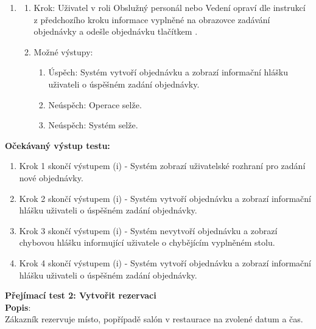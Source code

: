 \documentclass[a4paper,10pt]{article}
\begin{document}
\begin{enumerate}
	\item 
	\begin{enumerate}
		\item Krok: Uživatel v roli Obslužný personál nebo Vedení opraví dle instrukcí z předchozího kroku informace vyplněné na obrazovce zadávání objednávky a odešle objednávku tlačítkem .
		\item Možné výstupy:
		\begin{enumerate}
			\item Úspěch: Systém vytvoří objednávku a zobrazí informační hlášku uživateli o úspěšném zadání objednávky.
			\item Neúspěch: Operace selže.
			\item Neúspěch: Systém selže.
		\end{enumerate} 
	\end{enumerate}
\end{enumerate}

\textbf{Očekávaný výstup testu:} \\
\begin{enumerate}
	\item Krok 1 skončí výstupem (i) - Systém zobrazí uživatelské rozhraní pro zadání nové objednávky.
	\item Krok 2 skončí výstupem (i) - Systém vytvoří objednávku a zobrazí informační hlášku uživateli o úspěšném zadání objednávky.
	\item Krok 3 skončí výstupem (i) - Systém nevytvoří objednávku a zobrazí chybovou hlášku informující uživatele o chybějícím vyplněném stolu.
	\item Krok 4 skončí výstupem (i) - Systém vytvoří objednávku a zobrazí informační hlášku uživateli o úspěšném zadání objednávky.
\end{enumerate}


{\large\textbf{Přejímací test 2: Vytvořit rezervaci}} \\

\textbf{Popis}: \\\indent Zákazník rezervuje místo, popřípadě salón v restaurace na zvolené datum a čas. \\
\end{document}
